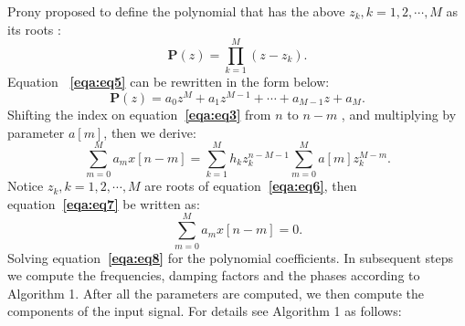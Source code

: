 Prony proposed to define the polynomial that has the 
above $z_k, k=1,2, \cdots , M$ as its roots \cite[]{prony}:
\begin{equation}
    \label{eqa:eq5}
    \mathbf{P}(z)  = \prod_{k=1}^{M}(z-z_k).
\end{equation}
Equation \textbf{~\ref{eqa:eq5}} can be rewritten in the form below:
\begin{equation}
    \label{eqa:eq6}
    \mathbf{P}(z) = a_0 z^M + a_1 z^{M-1} + \cdots + a_{M-1}z + a_M.
\end{equation}
Shifting the index on equation\textbf{~\ref{eqa:eq3}} from $n$ to $n-m$
, and multiplying by parameter $a[m]$, then we derive:
\begin{equation}
    \label{eqa:eq7}
    \sum_{m=0}^{M}a_mx[n-m] = \sum_{k=1}^{M}h_kz_k^{n-M-1}
    \sum_{m=0}^M a[m]z_{k}^{M-m}.
\end{equation}
Notice $z_k, k=1,2,\cdots, M$ are roots of equation\textbf{~\ref{eqa:eq6}},
then equation\textbf{~\ref{eqa:eq7}} be written as:
\begin{equation}
    \label{eqa:eq8}
    \sum_{m=0}^{M}a_mx[n-m] = 0.
\end{equation}
Solving equation\textbf{~\ref{eqa:eq8}} for the polynomial coefficients.
In subsequent steps we compute the frequencies, damping factors 
and the phases according to Algorithm 1. 
After all the parameters are computed, we then
compute the components of the input signal. For details see 
Algorithm 1 as follows:


